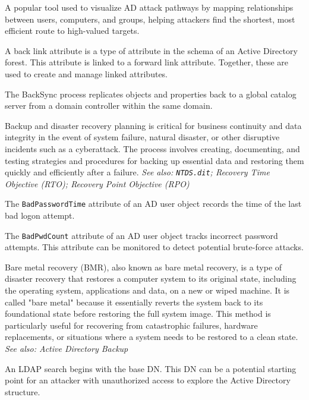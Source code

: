  A popular tool used to visualize AD attack pathways by mapping relationships between users, computers, and groups, helping attackers find the shortest, most efficient route to high-valued targets.

 A back link attribute is a type of attribute in the schema of an Active Directory forest. This attribute is linked to a forward link attribute. Together, these are used to create and manage linked attributes.

 The BackSync process replicates objects and properties back to a global catalog server from a domain controller within the same domain.

 Backup and disaster recovery planning is critical for business continuity and data integrity in the event of system failure, natural disaster, or other disruptive incidents such as a cyberattack. The process involves creating, documenting, and testing strategies and procedures for backing up essential data and restoring them quickly and efficiently after a failure.
\textit{See also: \texttt{NTDS.dit}; Recovery Time Objective (RTO); Recovery Point Objective (RPO)}

 The \texttt{BadPasswordTime} attribute of an AD user object records the time of the last bad logon attempt.

 The \texttt{BadPwdCount} attribute of an AD user object tracks incorrect password attempts. This attribute can be monitored to detect potential brute-force attacks.

 Bare metal recovery (BMR), also known as bare metal recovery, is a type of disaster recovery that restores a computer system to its original state, including the operating system, applications and data, on a new or wiped machine. It is called "bare metal" because it essentially reverts the system back to its foundational state before restoring the full system image. This method is particularly useful for recovering from catastrophic failures, hardware replacements, or situations where a system needs to be restored to a clean state. 
\textit{See also: Active Directory Backup}

 An LDAP search begins with the base DN. This DN can be a potential starting point for an attacker with unauthorized access to explore the Active Directory structure.

